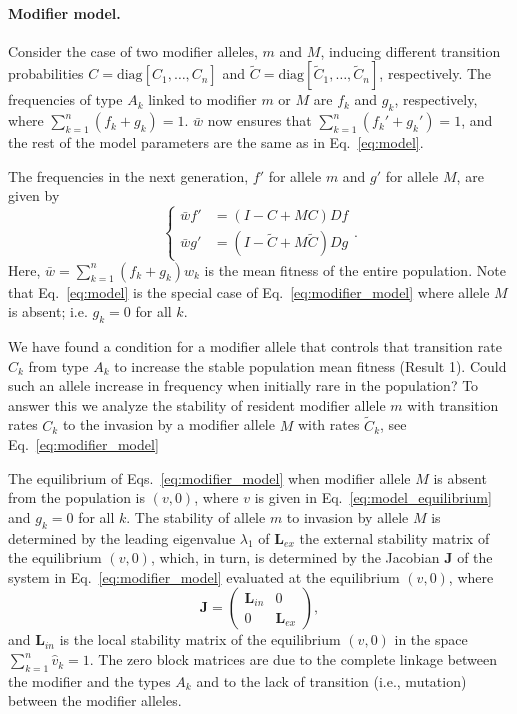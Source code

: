 \documentclass[9pt, a4paper, twocolumn]{extarticle}
\newcommand{\matrx}[1]{{\left[ \stackrel{}{#1}\right]}}
\newcommand{\diag}[1]{\mbox{diag}\matrx{#1}}
\newcommand{\cl}{\mathbf{L}}
\newcommand{\cj}{\mathbf{J}}
\begin{document}
\paragraph*{Modifier model.}
Consider the case of two modifier alleles, $m$ and $M$, inducing different transition probabilities $C=\diag{C_1, \ldots, C_n}$ and $\tilde{C}=\diag{\tilde{C}_1, \ldots, \tilde{C}_n}$, respectively.
The frequencies of type $A_k$ linked to modifier $m$ or $M$ are $f_k$ and $g_k$, respectively, where $\sum_{k=1}^{n}{(f_k + g_k)}=1$.
$\bar{w}$ now ensures that $\sum_{k=1}^{n}{(f_k' + g_k')}=1$, 
and the rest of the model parameters are the same as in Eq.~\ref{eq:model}.

The frequencies in the next generation, $f'$ for allele $m$ and $g'$ for allele $M$, are given by
\begin{equation}
\begin{cases}
\bar{w} f' &= (I-C+MC)D f \\
\bar{w} g' &= (I-\tilde{C}+M\tilde{C})D g
\end{cases}.
\label{eq:modifier_model}
\end{equation}
Here, $\bar{w}=\sum_{k=1}^{n}{(f_k + g_k) w_k}$ is the mean fitness of the entire population. 
Note that Eq.~\ref{eq:model} is the special case of Eq.~\ref{eq:modifier_model} where allele $M$ is absent; i.e. $g_k=0$ for all $k$.


We have found a condition for a modifier allele that controls that transition rate $C_k$ from type $A_k$ to increase the stable population mean fitness (Result 1).
Could such an allele increase in frequency when initially rare in the population?
To answer this we analyze the stability of resident modifier allele $m$ with transition rates $C_k$ to the invasion by a modifier allele $M$ with rates $\tilde{C}_k$, see Eq.~\ref{eq:modifier_model}~\citep[for an introduction to \emph{evolutionary invasion analysis}, see][ch.~12]{Otto2007}

The equilibrium of Eqs.~\ref{eq:modifier_model} when modifier allele $M$ is absent from the population is $(v, 0)$, where $v$ is given in Eq.~\ref{eq:model_equilibrium} and $g_k=0$ for all $k$. 
The stability of allele $m$ to invasion by allele $M$ is determined by the leading eigenvalue $\lambda_1$ of $\cl_{ex}$ the external stability matrix of the equilibrium $(v,0)$, which, in turn, is determined by the Jacobian $\cj$ of the system in Eq.~\ref{eq:modifier_model} evaluated at the equilibrium $(v,0)$, where
\begin{equation}
\cj = \begin{pmatrix}\cl_{in} & 0 \\ 0 & \cl_{ex} \end{pmatrix},
\end{equation}
and $\cl_{in}$ is the local stability matrix of the equilibrium $(v,0)$ in the space $\sum_{k=1}^n{\hat v_k}=1$.
The zero block matrices are due to the complete linkage between the modifier and the types $A_k$ and to the lack of transition (i.e., mutation) between the modifier alleles.
\end{document}
